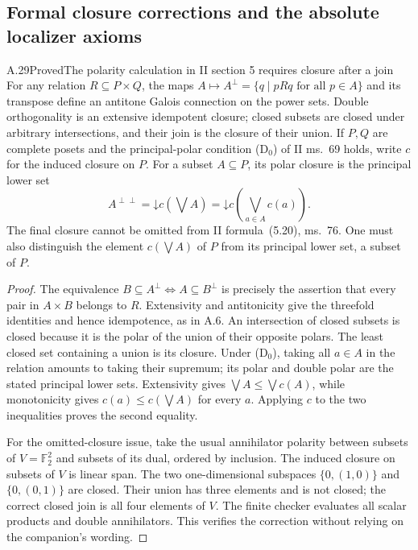 \subsection{Formal closure corrections and the absolute localizer axioms}

\begin{claim}{A.29}{Proved}{The polarity calculation in II section 5 requires closure after a join}
For any relation $R\subseteq P\times Q$, the maps
$A\mapsto A^\perp=\{q\mid pRq\text{ for all }p\in A\}$ and its transpose define an antitone Galois connection on the power sets. Double orthogonality is an extensive idempotent closure; closed subsets are closed under arbitrary intersections, and their join is the closure of their union. If $P,Q$ are complete posets and the principal-polar condition (D$_0$) of II ms.~69 holds, write $c$ for the induced closure on $P$. For a subset $A\subseteq P$, its polar closure is the principal lower set
\[
A^{\perp\perp}=\mathord\downarrow c\!\left(\bigvee A\right)
=\mathord\downarrow c\!\left(\bigvee_{a\in A}c(a)\right).
\]
The final closure cannot be omitted from II formula~(5.20), ms.~76. One must also distinguish the element $c(\bigvee A)$ of $P$ from its principal lower set, a subset of $P$.
\end{claim}
\begin{proof}
The equivalence $B\subseteq A^\perp\Longleftrightarrow A\subseteq B^\perp$ is precisely the assertion that every pair in $A\times B$ belongs to $R$. Extensivity and antitonicity give the threefold identities and hence idempotence, as in A.6. An intersection of closed subsets is closed because it is the polar of the union of their opposite polars. The least closed set containing a union is its closure. Under (D$_0$), taking all $a\in A$ in the relation amounts to taking their supremum; its polar and double polar are the stated principal lower sets. Extensivity gives $\bigvee A\leq\bigvee c(A)$, while monotonicity gives $c(a)\leq c(\bigvee A)$ for every $a$. Applying $c$ to the two inequalities proves the second equality.

For the omitted-closure issue, take the usual annihilator polarity between subsets of $V=\mathbb F_2^2$ and subsets of its dual, ordered by inclusion. The induced closure on subsets of $V$ is linear span. The two one-dimensional subspaces $\{0,(1,0)\}$ and $\{0,(0,1)\}$ are closed. Their union has three elements and is not closed; the correct closed join is all four elements of $V$. The finite checker evaluates all scalar products and double annihilators. This verifies the correction without relying on the companion's wording.
\end{proof}

